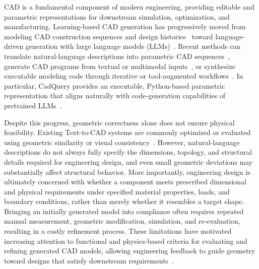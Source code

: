 CAD is a fundamental component of modern engineering, providing editable and parametric representations for downstream simulation, optimization, and manufacturing. Learning-based CAD generation has progressively moved from modeling CAD construction sequences and design histories~\citep{wu2021deepcad,willis2021fusion} toward language-driven generation with large language models (LLMs)~\citep{zhang2026large}. Recent methods can translate natural-language descriptions into parametric CAD sequences~\citep{khan2024text2cad}, generate CAD programs from textual or multimodal inputs~\citep{li2025llm4cad,sun2025large}, or synthesize executable modeling code through iterative or tool-augmented workflows~\citep{badagabettu2024query2cad,xie2025text,mallis2025cad}. In particular, CadQuery provides an executable, Python-based parametric representation that aligns naturally with code-generation capabilities of pretrained LLMs~\citep{xie2025text,guan2026cad}.

Despite this progress, geometric correctness alone does not ensure physical feasibility. Existing Text-to-CAD systems are commonly optimized or evaluated using geometric similarity or visual consistency~\citep{khan2024text2cad,alrashedy2025generating,xie2025text,guan2026cad}. 
However, natural-language descriptions do not always fully specify the dimensions, topology, and structural details required for engineering design, and even small geometric deviations may substantially affect structural behavior. More importantly, engineering design is ultimately concerned with whether a component meets prescribed dimensional and physical requirements under specified material properties, loads, and boundary conditions, rather than merely whether it resembles a target shape.
Bringing an initially generated model into compliance often requires repeated manual measurement, geometric modification, simulation, and re-evaluation, resulting in a costly refinement process. These limitations have motivated increasing attention to functional and physics-based criteria for evaluating and refining generated CAD models, allowing engineering feedback to guide geometry toward designs that satisfy downstream requirements~\citep{berger2026physics,son2026self}.

